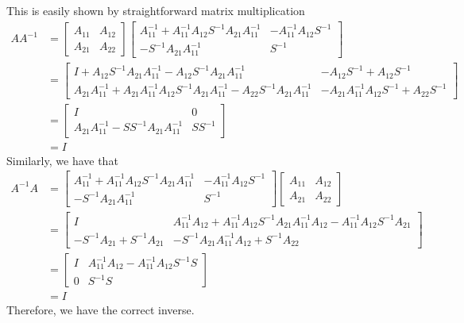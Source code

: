 \documentclass{homework}
\begin{document}
\begin{solution}
  This is easily shown by straightforward matrix multiplication
  \[ \begin{aligned}
      AA^{-1} &= 
   \begin{bmatrix}
     A_{11} & A_{12} \\
     A_{21} & A_{22}
   \end{bmatrix}
   \begin{bmatrix}
     A_{11}^{-1} + A_{11}^{-1}A_{12}S^{-1}A_{21}A_{11}^{-1} & -A_{11}^{-1}A_{12}S^{-1} \\
     -S^{-1}A_{21}A_{11}^{-1} & S^{-1}
   \end{bmatrix} \\
   &=
   \begin{bmatrix}
     I + A_{12}S^{-1}A_{21}A_{11}^{-1} - A_{12}S^{-1}A_{21}A_{11}^{-1} & -A_{12}S^{-1} + A_{12}S^{-1} \\
     A_{21}A_{11}^{-1} + A_{21}A_{11}^{-1}A_{12}S^{-1}A_{21}A_{11}^{-1} - A_{22}S^{-1}A_{21}A_{11}^{-1} & -A_{21}A_{11}^{-1}A_{12}S^{-1} + A_{22}S^{-1}
   \end{bmatrix} \\
   &=
   \begin{bmatrix}
     I & 0 \\
     A_{21}A_{11}^{-1} - SS^{-1}A_{21}A_{11}^{-1} & SS^{-1}
   \end{bmatrix} \\
   &= I
  \end{aligned} 
  \]
  Similarly, we have that
  \[
    \begin{aligned}
      A^{-1}A &=
   \begin{bmatrix}
     A_{11}^{-1} + A_{11}^{-1}A_{12}S^{-1}A_{21}A_{11}^{-1} & -A_{11}^{-1}A_{12}S^{-1} \\
     -S^{-1}A_{21}A_{11}^{-1} & S^{-1}
   \end{bmatrix} 
   \begin{bmatrix}
     A_{11} & A_{12} \\
     A_{21} & A_{22}
   \end{bmatrix} \\
   &=
   \begin{bmatrix}
     I & A_{11}^{-1}A_{12} + A_{11}^{-1}A_{12}S^{-1}A_{21}A_{11}^{-1}A_{12} - A_{11}^{-1}A_{12}S^{-1}A_{21} \\
     -S^{-1}A_{21} + S^{-1}A_{21} & -S^{-1}A_{21}A_{11}^{-1}A_{12} + S^{-1}A_{22}
   \end{bmatrix} \\
   &=
   \begin{bmatrix}
     I & A_{11}^{-1}A_{12} - A_{11}^{-1}A_{12}S^{-1}S \\
     0 & S^{-1}S
   \end{bmatrix} \\
   &= I
    \end{aligned}
  \]
  Therefore, we have the correct inverse.
  
\end{solution}
\end{document}
